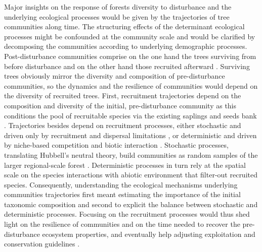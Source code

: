 \documentclass[fleqn,10pt]{ArtEcoFoG} %
\begin{document}
Major insights on the response of forests diversity to disturbance and
the underlying ecological processes would be given by the trajectories
of tree communities along time. The structuring effects of the
determinant ecological processes might be confounded at the community
scale \citep{Chave2004} and would be clarified by decomposing the
communities according to underlying demographic processes.
Post-disturbance communities comprise on the one hand the trees
surviving from before disturbance and on the other hand those recruited
afterward \citep{Herault2018}. Surviving trees obviously mirror the
diversity and composition of pre-disturbance communities, so the
dynamics and the resilience of communities would depend on the diversity
of recruited trees. First, recruitment trajectories depend on the
composition and diversity of the initial, pre-disturbance community as
this conditions the pool of recruitable species via the existing
saplings and seeds bank \citep{Herault2018}. Trajectories besides depend
on recruitment processes, either stochastic and driven only by
recruitment and dispersal limitations \citep{Hurtt1995, Hubbell2001}, or
deterministic and driven by niche-based competition and biotic
interaction \citep{Adler2007}. Stochastic processes, translating
Hubbell's neutral theory, build communities as random samples of the
larger regional-scale forest \citep{Hubbell2001, Chave2004}.
Deterministic processes in turn rely at the spatial scale on the species
interactions with abiotic environment that filter-out recruited species.
Consequently, understanding the ecological mechanisms underlying
communities trajectories first meant estimating the importance of the
initial taxonomic composition and second to explicit the balance between
stochastic and deterministic processes. Focusing on the recruitment
processes would thus shed light on the resilience of communities and on
the time needed to recover the pre-disturbance ecosystem properties, and
eventually help adjusting exploitation and conservation guidelines
\citep{Diaz2005, Gardner2007, Schwartz2017}.
\end{document}
